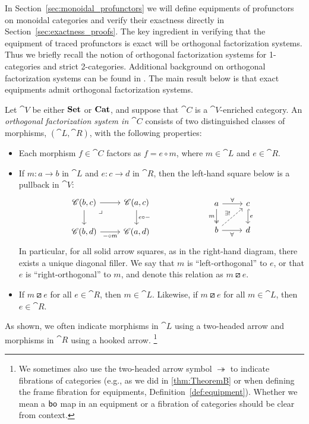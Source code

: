 \documentclass[11pt,oneside,article]{memoir}
\begin{document}
In Section~\ref{sec:monoidal_profunctors} we will define equipments of profunctors on monoidal categories and verify their exactness directly in Section~\ref{sec:exactness_proofs}. The key ingredient in verifying that the equipment of traced profunctors is exact will be orthogonal factorization systems. Thus we briefly recall the notion of orthogonal factorization systems for 1-categories and strict 2-categories. Additional background on orthogonal factorization systems can be found in \cite[Chapter 5.5]{BorceuxV1}. The main result below is that exact equipments admit orthogonal factorization systems. 
\begin{definition}
      \label{def:orthogonal}
   Let $\cat{V}$ be either $\mathbf{Set}$ or $\mathbf{Cat}$, and suppose that $\cat{C}$ is a $\cat{V}$-enriched
   category. An \emph{orthogonal factorization system in $\cat{C}$} consists of two distinguished
   classes of morphisms, $(\cat{L},\cat{R})$, with the following properties:
   \begin{itemize}
      \item Each morphism $f\in\cat{C}$ factors as $f=e\circ m$, where $m\in\cat{L}$ and
         $e\in\cat{R}$.
      \item If $m\colon a\to b$ in $\cat{L}$ and $e\colon c\to d$ in $\cat{R}$, then the left-hand
         square below is a pullback in $\cat{V}$:
         \begin{equation}
               \label{eqn:OrthFactSys}
            \begin{tikzcd}
               \cat{C}(b,c)\ar[r]\ar[d]\ar[rd,phantom,"\lrcorner" very near start]&\cat{C}(a,c)\ar[d,"e\circ -"]\\
               \cat{C}(b,d)\ar[r,"-\circ m"']&\cat{C}(a,d)
            \end{tikzcd}
            \hspace{.9in}
            \begin{tikzcd}
               a\ar[r,"\forall"]\ar[d,two heads,"m"']&c\ar[d,hook, "e"]\\
               b\ar[r,"\forall"']\ar[ur,dashed,"\exists!"]&d
            \end{tikzcd}
         \end{equation}
         In particular, for all solid arrow squares, as in the right-hand diagram, there exists a
         unique diagonal filler. We say that $m$ is ``left-orthogonal'' to $e$, or that $e$ is
         ``right-orthogonal'' to $m$, and denote this relation as $m\boxslash e$.
      \item If $m\boxslash e$ for all $e\in\cat{R}$, then $m\in\cat{L}$. Likewise, if $m\boxslash e$
         for all $m\in\cat{L}$, then $e\in\cat{R}$.
   \end{itemize}
   As shown, we often indicate morphisms in $\cat{L}$ using a two-headed arrow and morphisms in
   $\cat{R}$ using a hooked arrow.%
  \footnote{
     We sometimes also use the two-headed arrow symbol $\twoheadrightarrow$
     to indicate fibrations of categories (e.g., as we did in \ref{thm:TheoremB} or
     when defining the frame fibration for equipments, Definition~\ref{def:equipment}). Whether
     we mean a $\mathsf{bo}$ map in an equipment or a fibration of categories should be clear from context.
  }
\end{definition}
\end{document}
